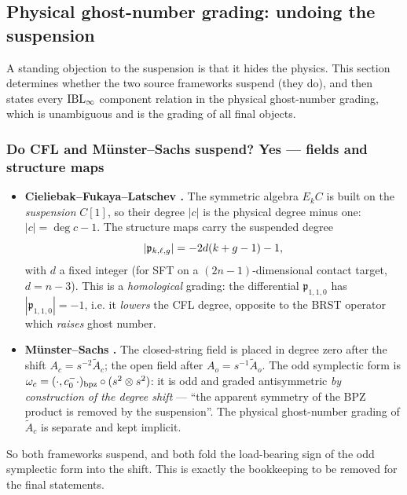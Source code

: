 \subsection{Physical ghost-number grading: undoing the suspension}
\label{ped:sec:grading}

A standing objection to the suspension is that it hides the physics. This section
determines whether the two source frameworks suspend (they do), and then states every
$\mathrm{IBL}_\infty$ component relation in the physical ghost-number grading, which is unambiguous and is
the grading of all final objects.

\subsubsection{Do CFL and Münster--Sachs suspend? Yes --- fields and structure maps}
\label{ped:sec:grading:susp}

\begin{itemize}[leftmargin=*]
	\setlength{\itemsep}{0.6ex}

	\item \textbf{Cieliebak--Fukaya--Latschev \cite{Cieliebak:2015:HomologicalAlgebraRelated}.} The symmetric algebra $E_kC$
	is built on the \emph{suspension} $C[1]$, so their degree $|c|$ is the physical degree
	minus one: $|c|=\deg c-1$. The structure maps carry the suspended degree
	\begin{equation}
		|\mathfrak{p}_{k,\ell,g}|=-2d(k+g-1)-1,
		\label{ped:eq:cfldeg}
	\end{equation}
	with $d$ a fixed integer (for SFT on a $(2n-1)$-dimensional contact target,
	$d=n-3$). This is a \emph{homological} grading: the differential $\mathfrak p_{1,1,0}$
	has $|\mathfrak p_{1,1,0}|=-1$, i.e. it \emph{lowers} the CFL degree, opposite to the
	BRST operator which \emph{raises} ghost number.

	\item \textbf{Münster--Sachs \cite{MunsterSachs2013,Muenster:2014:HomotopyClassificationBosonic}.} The closed-string
	field is placed in degree zero after the shift $A_c=s^{-2}\tilde A_c$; the open field
	after $A_o=s^{-1}\tilde A_o$. The odd symplectic form is
	$\omega_c=(\cdot,c_0^-\cdot)_{\rm bpz}\circ(s^2\otimes s^2)$: it is odd and graded
	antisymmetric \emph{by construction of the degree shift} --- \enquote{the apparent
	symmetry of the BPZ product is removed by the suspension}. The physical
	ghost-number grading of $\tilde A_c$ is separate and kept implicit.
\end{itemize}
So both frameworks suspend, and both fold the load-bearing sign of the odd symplectic form
into the shift. This is exactly the bookkeeping to be removed for the final
statements.

